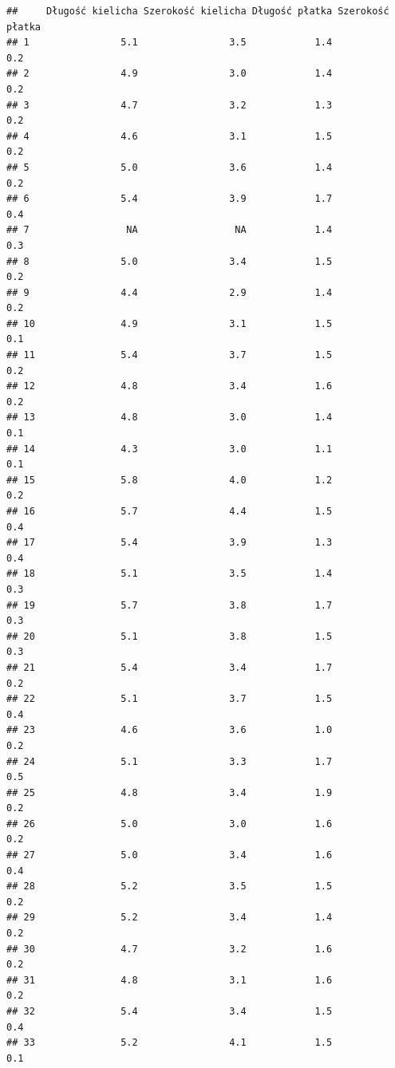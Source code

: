 \documentclass[
]{book}
\theoremstyle{plain}
\theoremstyle{definition}
\theoremstyle{definition}
\theoremstyle{definition}
\theoremstyle{definition}
\theoremstyle{definition}
\theoremstyle{remark}
\begin{document}
\begin{verbatim}
##     Długość kielicha Szerokość kielicha Długość płatka Szerokość płatka
## 1                5.1                3.5            1.4              0.2
## 2                4.9                3.0            1.4              0.2
## 3                4.7                3.2            1.3              0.2
## 4                4.6                3.1            1.5              0.2
## 5                5.0                3.6            1.4              0.2
## 6                5.4                3.9            1.7              0.4
## 7                 NA                 NA            1.4              0.3
## 8                5.0                3.4            1.5              0.2
## 9                4.4                2.9            1.4              0.2
## 10               4.9                3.1            1.5              0.1
## 11               5.4                3.7            1.5              0.2
## 12               4.8                3.4            1.6              0.2
## 13               4.8                3.0            1.4              0.1
## 14               4.3                3.0            1.1              0.1
## 15               5.8                4.0            1.2              0.2
## 16               5.7                4.4            1.5              0.4
## 17               5.4                3.9            1.3              0.4
## 18               5.1                3.5            1.4              0.3
## 19               5.7                3.8            1.7              0.3
## 20               5.1                3.8            1.5              0.3
## 21               5.4                3.4            1.7              0.2
## 22               5.1                3.7            1.5              0.4
## 23               4.6                3.6            1.0              0.2
## 24               5.1                3.3            1.7              0.5
## 25               4.8                3.4            1.9              0.2
## 26               5.0                3.0            1.6              0.2
## 27               5.0                3.4            1.6              0.4
## 28               5.2                3.5            1.5              0.2
## 29               5.2                3.4            1.4              0.2
## 30               4.7                3.2            1.6              0.2
## 31               4.8                3.1            1.6              0.2
## 32               5.4                3.4            1.5              0.4
## 33               5.2                4.1            1.5              0.1

\end{verbatim}
\end{document}
